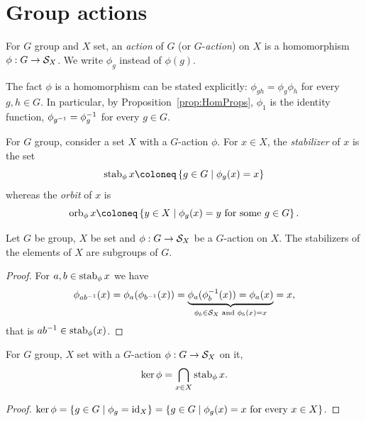 
\section{Group actions}

\begin{definition}
For \(G\) group and \(X\) set, an {\em action} of \(G\) (or \(G\)-{\em action}) on \(X\) is a homomorphism \(\phi : G \to \mathcal S_X\). We write \(\phi_g\) instead of \(\phi(g)\).
\end{definition}

The fact \(\phi\) is a homomorphism can be stated explicitly: \(\phi_{gh} = \phi_g \phi_h\) for every \(g, h \in G\). In particular, by Proposition~\ref{prop:HomProps}, \(\phi_1\) is the identity function, \(\phi_{g^{-1}} = \phi^{-1}_g\) for every \(g \in G\). 

\begin{definition}
For \(G\) group, consider a set \(X\) with a \(G\)-action \(\phi\). For \(x \in X\), the {\em stabilizer} of \(x\) is the set
\[\stab_\phi x \coloneq \set{g \in G \mid \phi_g(x) = x}\]
whereas the {\em orbit} of \(x\) is
\[\orb_\phi x \coloneq \set{y \in X \mid \phi_g(x) = y \text{ for some } g \in G}.\]
\end{definition}

\begin{proposition}
Let \(G\) be group, \(X\) be set and \(\phi : G \to \mathcal S_X\) be a \(G\)-action on \(X\). The stabilizers of the elements of \(X\) are subgroups of \(G\).
\end{proposition}

\begin{proof}
For \(a, b \in \operatorname{stab}_\phi x\) we have
\[\phi_{a b^{-1}}(x) = \phi_a (\phi_{b^{-1}} (x)) = \underbrace{\phi_a (\phi^{-1}_b(x)) = \phi_a (x)}_{\phi_b \in \mathcal S_X \text{ and } \phi_b(x) = x} = x ,\]
that is \(a b^{-1} \in \operatorname{stab}_\phi (x)\).
\end{proof}

\begin{proposition}
For \(G\) group, \(X\) set with a \(G\)-action \(\phi : G \to \mathcal S_X\) on it,
\[\ker \phi = \bigcap_{x \in X} \operatorname{stab}_\phi x .\]
\end{proposition}

\begin{proof}
\(\ker \phi = \left\{g \in G \mid \phi_g = \text{id}_X\right\} = \left\{g \in G \mid \phi_g(x) = x \text{ for every } x \in X\right\}\).
\end{proof}

